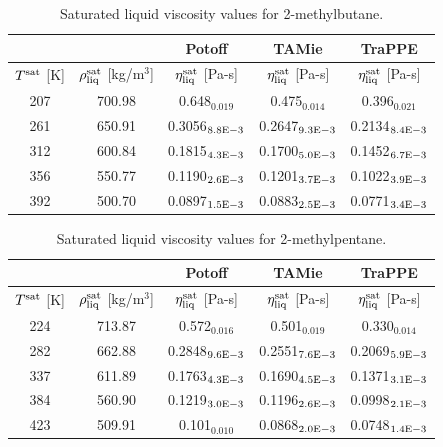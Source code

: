 \documentclass[preprint,review,12pt]{elsarticle}
\begin{document}
	\begin{table}[H]
		\caption{Saturated liquid viscosity values for 2-methylbutane.}
		\begin{center}
			\begin{tabular}{|c|c|c|c|c|}
				\hline
				&                                       & Potoff            & TAMie             & TraPPE            \\ \hline
				$T^{\rm sat}$ {[}K{]} & $\rho^{\rm sat}_{\rm liq}$ [kg/m$^3$] & $\eta_{\rm liq}^{\rm sat}$ {[}Pa-s{]} & $\eta_{\rm liq}^{\rm sat}$ {[}Pa-s{]} & $\eta_{\rm liq}^{\rm sat}$ {[}Pa-s{]} \\ \hline
				207 & 700.98 & 0.648$_{0.019}$   & 0.475$_{0.014}$   & 0.396$_{0.021}$   \\ \hline
				261 & 650.91 & 0.3056$_{8.8 \rm E-3}$ & 0.2647$_{9.3 \rm E-3}$ & 0.2134$_{8.4 \rm E-3}$ \\ \hline
				312 & 600.84 & 0.1815$_{4.3 \rm E-3}$ & 0.1700$_{5.0 \rm E-3}$ & 0.1452$_{6.7 \rm E-3}$ \\ \hline
				356 & 550.77 & 0.1190$_{2.6 \rm E-3}$ & 0.1201$_{3.7 \rm E-3}$ & 0.1022$_{3.9 \rm E-3}$ \\ \hline
				392 & 500.70 & 0.0897$_{1.5 \rm E-3}$ & 0.0883$_{2.5 \rm E-3}$ & 0.0771$_{3.4 \rm E-3}$ \\ \hline
			\end{tabular}
		\end{center}
	\end{table}
	
	\begin{table}[H]
		\caption{Saturated liquid viscosity values for 2-methylpentane.}
		\begin{center}
			\begin{tabular}{|c|c|c|c|c|}
				\hline
				&                                       & Potoff            & TAMie             & TraPPE            \\ \hline
				$T^{\rm sat}$ {[}K{]} & $\rho^{\rm sat}_{\rm liq}$ [kg/m$^3$] & $\eta_{\rm liq}^{\rm sat}$ {[}Pa-s{]} & $\eta_{\rm liq}^{\rm sat}$ {[}Pa-s{]} & $\eta_{\rm liq}^{\rm sat}$ {[}Pa-s{]} \\ \hline
				224 & 713.87 & 0.572$_{0.016}$   & 0.501$_{0.019}$   & 0.330$_{0.014}$   \\ \hline
				282 & 662.88 & 0.2848$_{9.6 \rm E-3}$ & 0.2551$_{7.6 \rm E-3}$ & 0.2069$_{5.9 \rm E-3}$ \\ \hline
				337 & 611.89 & 0.1763$_{4.3 \rm E-3}$ & 0.1690$_{4.5 \rm E-3}$ & 0.1371$_{3.1 \rm E-3}$ \\ \hline
				384 & 560.90 & 0.1219$_{3.0 \rm E-3}$ & 0.1196$_{2.6 \rm E-3}$ & 0.0998$_{2.1 \rm E-3}$ \\ \hline
				423 & 509.91 & 0.101$_{0.010}$   & 0.0868$_{2.0 \rm E-3}$ & 0.0748$_{1.4 \rm E-3}$ \\ \hline
			\end{tabular}
		\end{center}
	\end{table}
	
\end{document}
